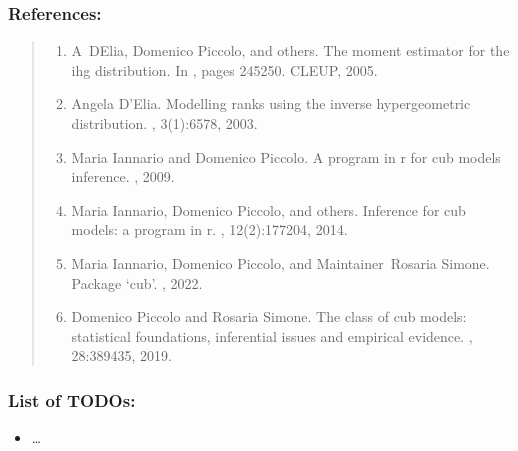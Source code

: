\documentclass[letterpaper,10pt,english]{sphinxmanual}
\begin{document}
\subsubsection{References:}
\label{\detokenize{cubmods:id721}}\begin{quote}
\begin{enumerate}
%
\setcounter{enumi}{0}
\item {} 
\sphinxAtStartPar
A D\textquotesingle{}Elia, Domenico Piccolo, and others. The moment estimator for the ihg distribution. In , pages 245\textendash{}250. CLEUP, 2005.

\item {} 
\sphinxAtStartPar
Angela D’Elia. Modelling ranks using the inverse hypergeometric distribution. , 3(1):65\textendash{}78, 2003.

\item {} 
\sphinxAtStartPar
Maria Iannario and Domenico Piccolo. A program in r for cub models inference. , 2009.

\item {} 
\sphinxAtStartPar
Maria Iannario, Domenico Piccolo, and others. Inference for cub models: a program in r. , 12(2):177\textendash{}204, 2014.

\item {} 
\sphinxAtStartPar
Maria Iannario, Domenico Piccolo, and Maintainer Rosaria Simone. Package ‘cub’. , 2022.

\item {} 
\sphinxAtStartPar
Domenico Piccolo and Rosaria Simone. The class of cub models: statistical foundations, inferential issues and empirical evidence. , 28:389\textendash{}435, 2019.

\end{enumerate}
\end{quote}


\subsubsection{List of TODOs:}
\label{\detokenize{cubmods:id759}}\begin{itemize}
\item {} 
\sphinxAtStartPar
…

\end{itemize}
\end{document}
